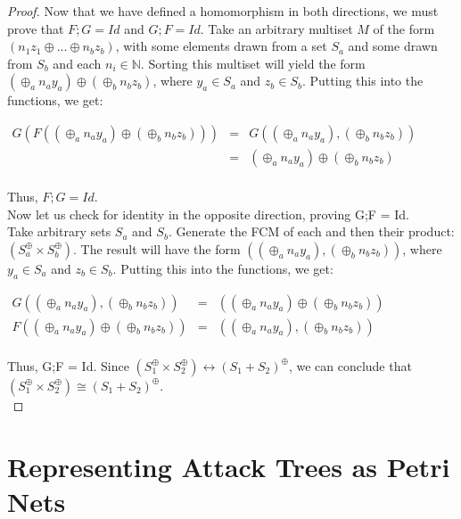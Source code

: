 \begin{lemma}
\begin{proof}
Now that we have defined a homomorphism in both directions, we must
prove that $F;G = Id$ and $G;F = Id$. Take an arbitrary multiset $M$
of the form $(n_1z_1 \oplus ... \oplus n_bz_b)$, with some elements
drawn from a set $S_a$ and some drawn from $S_b$ and each $n_i \in
\mathbb{N}$. Sorting this multiset will yield the form $(\oplus_a n_a
y_a) \oplus (\oplus_b n_b z_b)$, where $y_a \in S_a$ and $z_b \in
S_b$. Putting this into the functions, we get:
\begin{center}
  \begin{math}
    \begin{array}{lll}
      G(F((\oplus_a n_a y_a) \oplus (\oplus_b n_b z_b)))
      & = & G((\oplus_a n_a y_a), (\oplus_b n_b z_b))\\
      & = & (\oplus_a n_a y_a) \oplus (\oplus_b n_b z_b)\\
    \end{array}
  \end{math}
\end{center}
Thus, $F;G = Id$.\\

Now let us check for identity in the opposite direction, proving G;F = Id.\\
Take arbitrary sets $S_a$ and $S_b$. Generate the FCM of each and then their product: $(S_a^\oplus \times S_b^\oplus)$. The result will have the form $((\oplus_a n_a y_a), (\oplus_b n_b z_b))$, where $y_a \in S_a$ and $z_b \in S_b$. Putting this into the functions, we get:\\
\begin{center}
  \begin{math}
    \begin{array}{lll}
     G((\oplus_a n_a y_a), (\oplus_b n_b z_b)) & = & ((\oplus_a n_a y_a) \oplus (\oplus_b n_b z_b)) \\
     F((\oplus_a n_a y_a) \oplus (\oplus_b n_b z_b)) & = & ((\oplus_a n_a y_a), (\oplus_b n_b z_b))\\
    \end{array}
  \end{math}
\end{center}
 
Thus, G;F = Id. 
Since $(S_1 ^\oplus \times S_2 ^\oplus) \leftrightarrow (S_1 + S_2)^\oplus$, we can conclude that $(S_1 ^\oplus \times S_2 ^\oplus) \cong (S_1 + S_2)^\oplus$.\\
\end{proof}
%
\end{lemma}
%
\section{Representing Attack Trees as Petri Nets}
